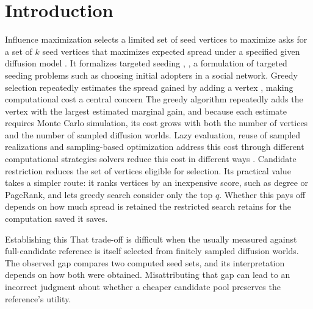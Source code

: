 \documentclass[smallextended]{svjour3}
\providecommand{\DIFaddtex}[1]{{\protect\color{blue} \sf #1}} %
\providecommand{\DIFdeltex}[1]{{\protect\color{red} \scriptsize #1}} %
\providecommand{\DIFaddbegin}{} %
\providecommand{\DIFaddend}{} %
\providecommand{\DIFdelbegin}{} %
\providecommand{\DIFdelend}{} %
\providecommand{\DIFadd}[1]{\texorpdfstring{\DIFaddtex{#1}}{#1}} %
\providecommand{\DIFdel}[1]{\texorpdfstring{\DIFdeltex{#1}}{}} %
\providecommand{\DIFscaledelfig}{0.5}
\newlength{\DIFdelgraphicswidth} %
\newlength{\DIFdelgraphicsheight} %
\providecommand{\DIFaddincludegraphics}[2][]{{\color{blue}\fbox{\DIFOincludegraphics[#1]{#2}}}} %
\providecommand{\DIFdelincludegraphics}[2][]{%
\sbox{\DIFdelgraphicsbox}{\DIFOincludegraphics[#1]{#2}}%
\settoboxwidth{\DIFdelgraphicswidth}{\DIFdelgraphicsbox} %
\settoboxtotalheight{\DIFdelgraphicsheight}{\DIFdelgraphicsbox} %
\scalebox{\DIFscaledelfig}{%
\parbox[b]{\DIFdelgraphicswidth}{\usebox{\DIFdelgraphicsbox}\\[-\baselineskip] \rule{\DIFdelgraphicswidth}{0em}}\llap{\resizebox{\DIFdelgraphicswidth}{\DIFdelgraphicsheight}{%
\setlength{\unitlength}{\DIFdelgraphicswidth}%
\begin{picture}(1,1)%
\thicklines\linethickness{2pt} %
{\color[rgb]{1,0,0}\put(0,0){\framebox(1,1){}}}%
{\color[rgb]{1,0,0}\put(0,0){\line( 1,1){1}}}%
{\color[rgb]{1,0,0}\put(0,1){\line(1,-1){1}}}%
\end{picture}%
}\hspace*{3pt}}} %
} %
\DeclareRobustCommand{\DIFaddbegin}{\DIFOaddbegin \let\includegraphics\DIFaddincludegraphics} %
\DeclareRobustCommand{\DIFaddend}{\DIFOaddend \let\includegraphics\DIFOincludegraphics} %
\DeclareRobustCommand{\DIFdelbegin}{\DIFOdelbegin \let\includegraphics\DIFdelincludegraphics} %
\DeclareRobustCommand{\DIFdelend}{\DIFOaddend \let\includegraphics\DIFOincludegraphics} %
\begin{document}
\begin{abstract}
\end{abstract}

\section{Introduction}
Influence maximization \DIFdelbegin \DIFdel{selects a limited set of seed vertices to maximize }\DIFdelend \DIFaddbegin \DIFadd{asks for a set of $k$ seed vertices that maximizes }\DIFaddend expected spread under a \DIFdelbegin \DIFdel{specified }\DIFdelend \DIFaddbegin \DIFadd{given }\DIFaddend diffusion model \cite{ref1}\DIFdelbegin \DIFdel{. It formalizes targeted seeding , }\DIFdelend \DIFaddbegin \DIFadd{, a formulation of targeted seeding problems }\DIFaddend such as choosing initial adopters in a social network. \DIFdelbegin \DIFdel{Greedy selection repeatedly estimates the spread gained by adding a vertex , making computational cost a central concern}\DIFdelend \DIFaddbegin \DIFadd{The greedy algorithm repeatedly adds the vertex with the largest estimated marginal gain, and because each estimate requires Monte Carlo simulation, its cost grows with both the number of vertices and the number of sampled diffusion worlds}\DIFaddend . Lazy evaluation, reuse of sampled realizations and sampling-based \DIFdelbegin \DIFdel{optimization address this cost through different computational strategies }\DIFdelend \DIFaddbegin \DIFadd{solvers reduce this cost in different ways }\DIFaddend \cite{ref7,ref8,ref2}. Candidate restriction \DIFdelbegin \DIFdel{reduces the set of vertices eligible for selection. Its practical value }\DIFdelend \DIFaddbegin \DIFadd{takes a simpler route: it ranks vertices by an inexpensive score, such as degree or PageRank, and lets greedy search consider only the top $q$. Whether this pays off }\DIFaddend depends on how much spread \DIFdelbegin \DIFdel{is retained }\DIFdelend \DIFaddbegin \DIFadd{the restricted search retains }\DIFaddend for the computation \DIFdelbegin \DIFdel{saved}\DIFdelend \DIFaddbegin \DIFadd{it saves}\DIFaddend .

\DIFdelbegin \DIFdel{Establishing this }\DIFdelend \DIFaddbegin \DIFadd{That }\DIFaddend trade-off is \DIFdelbegin \DIFdel{difficult when the }\DIFdelend \DIFaddbegin \DIFadd{usually measured against }\DIFaddend full-candidate \DIFdelbegin \DIFdel{reference is itself selected from finitely sampled diffusion worlds. The observed gap compares two computed seed sets, and its interpretation depends on how both were obtained. Misattributing that gap can lead to an incorrect judgment about whether a cheaper candidate pool preserves the reference's utility. }%
\end{document}
